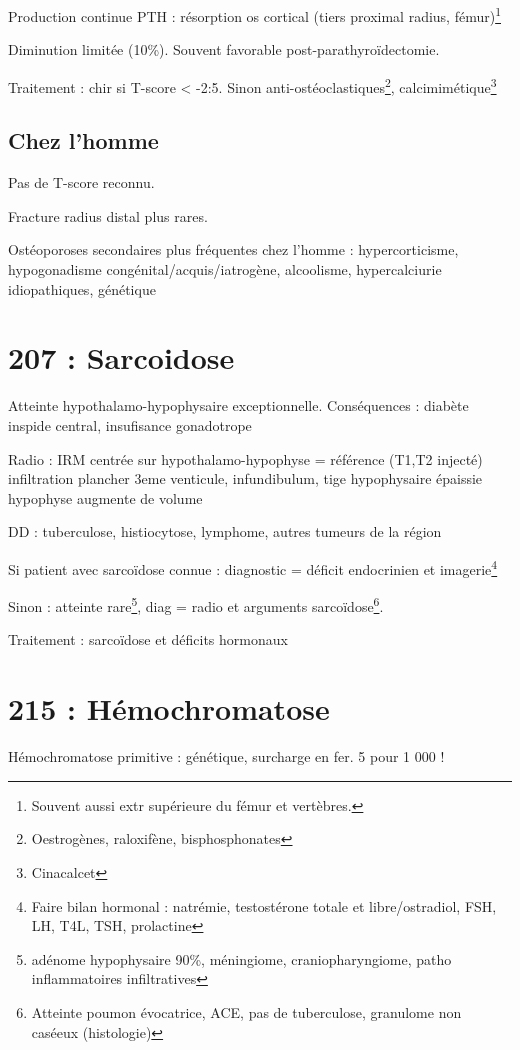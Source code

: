 \documentclass[11pt]{article}
\begin{document}
Production continue PTH : \inc résorption os cortical (tiers proximal radius,
fémur)\footnote{Souvent aussi extr supérieure du fémur et vertèbres.}

Diminution limitée (10\%). Souvent favorable post-parathyroïdectomie.

Traitement : chir si T-score < -2:5. Sinon anti-ostéoclastiques\footnote{Oestrogènes, raloxifène, bisphosphonates}, calcimimétique\footnote{Cinacalcet}

\subsection{Chez l'homme}
\label{sec:org0a11a04}
Pas de T-score reconnu. 

Fracture radius distal plus rares.

Ostéoporoses secondaires plus fréquentes chez l'homme : hypercorticisme,
hypogonadisme congénital/acquis/iatrogène, alcoolisme, hypercalciurie
idiopathiques, génétique
\section{207 : Sarcoidose}
\label{sec:orga56bf49}
Atteinte hypothalamo-hypophysaire exceptionnelle. Conséquences : diabète
inspide central, insufisance gonadotrope

Radio : IRM centrée sur hypothalamo-hypophyse = référence (T1,T2 injecté) \thus
infiltration plancher 3eme venticule, infundibulum, tige hypophysaire épaissie
\textpm{} hypophyse augmente de volume

DD : tuberculose, histiocytose, lymphome, autres tumeurs de la région 

Si patient avec sarcoïdose connue : diagnostic = déficit endocrinien et imagerie\footnote{Faire bilan hormonal : natrémie, testostérone totale et libre/ostradiol,
FSH, LH, T4L, TSH, prolactine}

Sinon : atteinte rare\footnote{adénome hypophysaire 90\%, méningiome, craniopharyngiome, patho
inflammatoires infiltratives}, diag = radio et arguments sarcoïdose\footnote{Atteinte poumon évocatrice, \inc{} ACE, pas de tuberculose, granulome
non caséeux (histologie)}.

Traitement : sarcoïdose et déficits hormonaux

\section{215 : Hémochromatose}
\label{sec:org0e491bb}
Hémochromatose primitive : génétique, surcharge en fer. 5 pour 1 000 !
\end{document}
